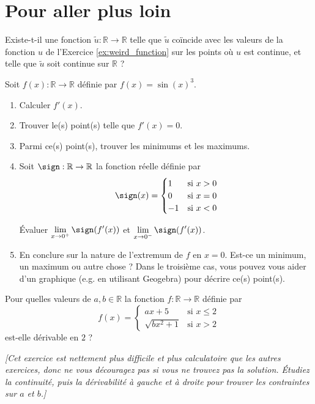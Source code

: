 \part{Pour aller plus loin\textellipsis}

\begin{exercice}
Existe-t-il une fonction $\tilde{u} : \mathbb{R} \to \mathbb{R}$ telle que $\tilde{u}$ coïncide avec les valeurs de la fonction $u$ de l'Exercice \ref{ex:weird_function} sur les points où $u$ est continue, et telle que $\tilde{u}$ soit continue sur $\mathbb{R}$ ?
\end{exercice}

\begin{exercice}

Soit $f(x) : \mathbb{R} \to \mathbb{R}$ définie par $f(x) = \sin(x)^3$.
\begin{enumerate}
    \item Calculer $f'(x)$.
    \item Trouver le(s) point(s) telle que $f'(x) = 0$.
    \item Parmi ce(s) point(s), trouver les minimums et les maximums.
    \item 
    Soit $\sign : \mathbb{R} \to \mathbb{R}$ la fonction réelle définie par
    \[
    \sign(x) = \begin{cases}
    1 & \textrm{si } x > 0 \\
    0 & \textrm{si } x = 0 \\
    -1 & \textrm{si } x < 0
    \end{cases}
    \]
    
    Évaluer $\displaystyle \lim_{x \to 0^+} \sign(f'(x))$ et $\displaystyle \lim_{x \to 0^-} \sign(f'(x))$.
    
    \item En conclure sur la nature de l'extremum de $f$ en $x = 0$. Est-ce un minimum, un maximum ou autre chose ? Dans le troisième cas, vous pouvez vous aider d'un graphique (e.g. en utilisant Geogebra) pour décrire ce(s) point(s).
\end{enumerate}
\end{exercice}

\begin{exercice}
Pour quelles valeurs de $a, b \in \mathbb{R}$ la fonction $f : \mathbb{R} \to \mathbb{R}$ définie par
\[
f(x) = \begin{cases}
ax + 5 & \textrm{si } x \leq 2 \\
\sqrt{bx^2 + 1} & \textrm{si } x > 2
\end{cases}
\]
est-elle dérivable en $2$ ?

\emph{[Cet exercice est nettement plus difficile et plus calculatoire que les autres exercices, donc ne vous découragez pas si vous ne trouvez pas la solution. Étudiez la continuité, puis la dérivabilité à gauche et à droite pour trouver les contraintes sur $a$ et $b$.]}
\end{exercice}